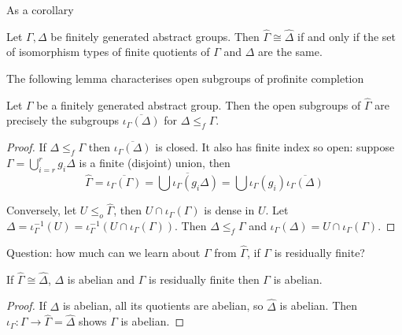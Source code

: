 \documentclass[a4paper]{article}
\begin{document}
As a corollary

\begin{theorem}
  Let \(\Gamma, \Delta\) be finitely generated abstract groups. Then \(\hat \Gamma \cong \hat \Delta\) if and only if the set of isomorphism types of finite quotients of \(\Gamma\) and \(\Delta\) are the same.
\end{theorem}

The following lemma characterises open subgroups of profinite completion


\begin{lemma}
  \label{lem:subgroup correspondence for profinite completion}
  Let \(\Gamma\) be a finitely generated abstract group. Then the open subgroups of \(\hat \Gamma\) are precisely the subgroups \(\overline{\iota_\Gamma(\Delta)}\) for \(\Delta \leq_f \Gamma\).
\end{lemma}

\begin{proof}
  If \(\Delta \leq_f \Gamma\) then \(\overline{\iota_\Gamma(\Delta)}\) is closed. It also has finite index so open: suppose \(\Gamma = \bigcup_{i = r}^r g_i \Delta\) is a finite (disjoint) union, then
  \[
    \hat \Gamma = \overline{\iota_\Gamma(\Gamma)}
    = \overline{\bigcup \iota_\Gamma(g_i \Delta)}
    = \bigcup \iota_\Gamma(g_i) \overline{\iota_\Gamma(\Delta)}
  \]

  Conversely, let \(U \leq_o \hat \Gamma\), then \(U \cap \iota_\Gamma(\Gamma)\) is dense in \(U\). Let \(\Delta = \iota_\Gamma^{-1}(U) = \iota_\Gamma^{-1}(U \cap \iota_\Gamma(\Gamma))\). Then \(\Delta \leq_f \Gamma\) and \(\iota_\Gamma(\Delta) = U \cap \iota_\Gamma(\Gamma)\).
\end{proof}


Question: how much can we learn about \(\Gamma\) from \(\hat \Gamma\), if \(\Gamma\) is residually finite?

\begin{proposition}
  If \(\hat \Gamma \cong \hat \Delta\), \(\Delta\) is abelian and \(\Gamma\) is residually finite then \(\Gamma\) is abelian.
\end{proposition}

\begin{proof}
  If \(\Delta\) is abelian, all its quotients are abelian, so \(\hat \Delta\) is abelian. Then \(\iota_\Gamma: \Gamma \to \hat \Gamma = \hat \Delta\) shows \(\Gamma\) is abelian.
\end{proof}
\end{document}
